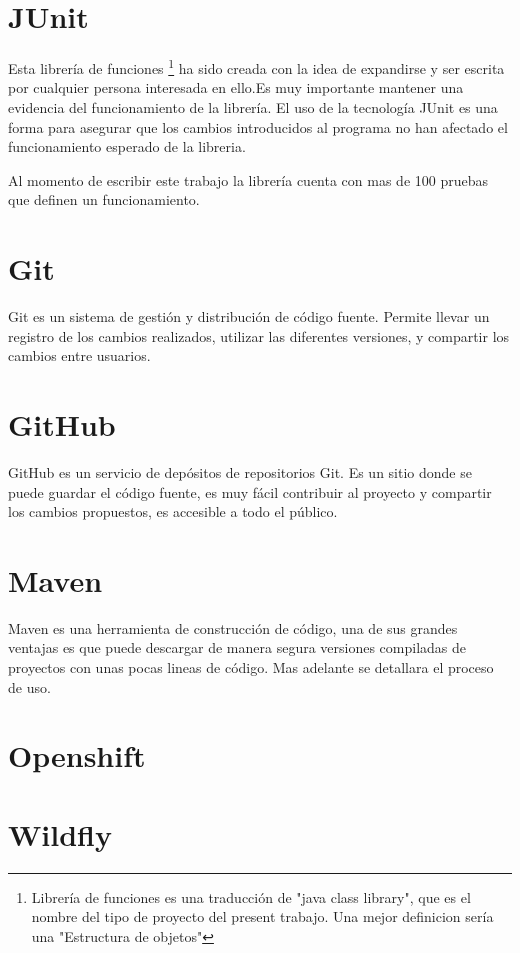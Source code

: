 	\section{JUnit}

		Esta librería de funciones \footnote{Librería de funciones es una traducción de "java class library", que es el nombre del tipo de proyecto del present trabajo. Una mejor definicion sería una "Estructura de objetos"} ha sido creada con la idea de expandirse y ser escrita por cualquier persona interesada en ello.Es muy importante mantener una evidencia del funcionamiento de la librería. El uso de la tecnología JUnit es una forma para asegurar que los cambios introducidos al programa no han afectado el funcionamiento esperado de la libreria.

		Al momento de escribir este trabajo la librería cuenta con mas de 100 pruebas que definen un funcionamiento.
	\section{Git}

		Git es un sistema de gestión y distribución de código fuente. Permite llevar un registro de los cambios realizados, utilizar las diferentes versiones, y compartir los cambios entre usuarios.

	\section{GitHub}

		GitHub es un servicio de depósitos de repositorios Git. Es un sitio donde se puede guardar el código fuente, es muy fácil contribuir al proyecto y compartir los cambios propuestos, es accesible a todo el público.

	\section{Maven}

		Maven es una herramienta de construcción de código, una de sus grandes ventajas es que puede descargar de manera segura versiones compiladas de proyectos con unas pocas lineas de código. Mas adelante se detallara el proceso de uso.

	\section{Openshift}

	\section{Wildfly}

